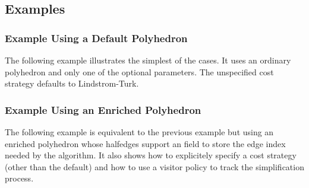 \subsection{Examples}

\subsubsection{Example Using a Default Polyhedron}

The following example illustrates the simplest of the cases. It uses
an ordinary polyhedron and only one of the optional parameters.
The unspecified cost strategy defaults to Lindstrom-Turk.

\subsubsection{Example Using an Enriched Polyhedron}

The following example is equivalent to the previous example but using an
enriched polyhedron whose halfedges support an  field to
store the edge index needed by the algorithm. It also shows how to
explicitely specify a cost strategy (other than the default)
and how to use a visitor policy to track the simplification process.




